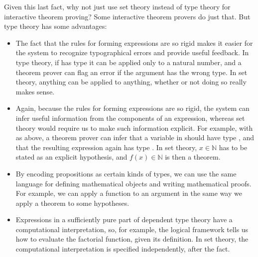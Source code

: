 \documentclass[letterpaper,10pt,english]{sphinxmanual}
\begin{document}
\sphinxAtStartPar
Given this last fact, why not just use set theory instead of type theory for interactive theorem proving? Some interactive theorem provers do just that. But type theory has some advantages:
\begin{itemize}
\item {} 
\sphinxAtStartPar
The fact that the rules for forming expressions are so rigid makes it easier for the system to recognize typographical errors and provide useful feedback. In type theory, if  has type  it can be applied only to a natural number, and a theorem prover can flag an error if the argument has the wrong type. In set theory, anything can be applied to anything, whether or not doing so really makes sense.

\item {} 
\sphinxAtStartPar
Again, because the rules for forming expressions are so rigid, the system can infer useful information from the components of an expression, whereas set theory would require us to make such information explicit. For example, with  as above, a theorem prover can infer that a variable  in  should have type , and that the resulting expression again has type . In set theory, \(x \in \mathbb{N}\) has to be stated as an explicit hypothesis, and \(f(x) \in \mathbb{N}\) is then a theorem.

\item {} 
\sphinxAtStartPar
By encoding propositions as certain kinds of types, we can use the same language for defining mathematical objects and writing mathematical proofs. For example, we can apply a function to an argument in the same way we apply a theorem to some hypotheses.

\item {} 
\sphinxAtStartPar
Expressions in a sufficiently pure part of dependent type theory have a computational interpretation, so, for example, the logical framework tells us how to evaluate the factorial function, given its definition. In set theory, the computational interpretation is specified independently, after the fact.

\end{itemize}
\end{document}
